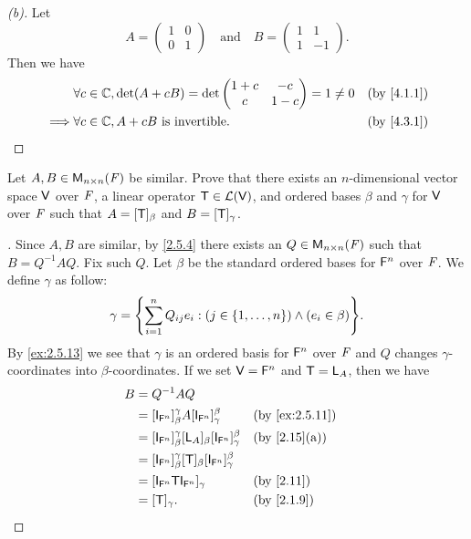 \begin{proof}[(b)]
	Let
	\[
		A = \begin{pmatrix}
			1 & 0 \\
			0 & 1
		\end{pmatrix} \quad \text{and} \quad B = \begin{pmatrix}
			1 & 1  \\
			1 & -1
		\end{pmatrix}.
	\]
	Then we have
	\begin{align*}
		         & \forall c \in \C, \det(A + cB) = \det\begin{pmatrix}
			                                                1 + c & -c    \\
			                                                c     & 1 - c
		                                                \end{pmatrix} = 1 \neq 0 &  & \by{4.1.1} \\
		\implies & \forall c \in \C, A + cB \text{ is invertible}.      &  & \by{4.3.1}
	\end{align*}
\end{proof}

\begin{ex}\label{ex:5.1.19}
	Let \(A, B \in \ms[n][n][\F]\) be similar.
	Prove that there exists an \(n\)-dimensional vector space \(\mathsf{V}\) over \(\mathit{F}\), a linear operator \(\mathsf{T} \in \mathcal{L}(\mathsf{V})\), and ordered bases \(\beta\) and \(\gamma\) for \(\mathsf{V}\) over \(\mathit{F}\) such that \(A = [\mathsf{T}]_{\beta}\) and \(B = [\mathsf{T}]_{\gamma}\).
\end{ex}

\begin{proof}[]
	Since \(A, B\) are similar, by \cref{2.5.4} there exists an \(Q \in \ms[n][n][\F]\) such that \(B = Q^{-1} A Q\).
	Fix such \(Q\).
	Let \(\beta\) be the standard ordered bases for \(\mathsf{F}^n\) over \(\mathit{F}\).
	We define \(\gamma\) as follow:
	\[
		\gamma = \set{\sum_{i = 1}^n Q_{i j} e_i : (j \in \set{1, \dots, n}) \land (e_i \in \beta)}.
	\]
	By \cref{ex:2.5.13} we see that \(\gamma\) is an ordered basis for \(\mathsf{F}^n\) over \(\mathit{F}\) and \(Q\) changes \(\gamma\)-coordinates into \(\beta\)-coordinates.
	If we set \(\mathsf{V} = \mathsf{F}^n\) and \(\mathsf{T} = \mathsf{L}_A\), then we have
	\begin{align*}
		B & = Q^{-1} A Q                                                                                           \\
		  & = [\IT[\vs{F}^n]]_{\beta}^{\gamma} A [\IT[\vs{F}^n]]_{\gamma}^{\beta}              &  & \by{ex:2.5.11} \\
		  & = [\IT[\vs{F}^n]]_{\beta}^{\gamma} [\L_A]_{\beta} [\IT[\vs{F}^n]]_{\gamma}^{\beta} &  & \by{2.15}[a]   \\
		  & = [\IT[\vs{F}^n]]_{\beta}^{\gamma} [\T]_{\beta} [\IT[\vs{F}^n]]_{\gamma}^{\beta}                       \\
		  & = [\IT[\vs{F}^n] \T \IT[\vs{F}^n]]_{\gamma}                                        &  & \by{2.11}      \\
		  & = [\T]_{\gamma}.                                                                   &  & \by{2.1.9}
	\end{align*}
\end{proof}

